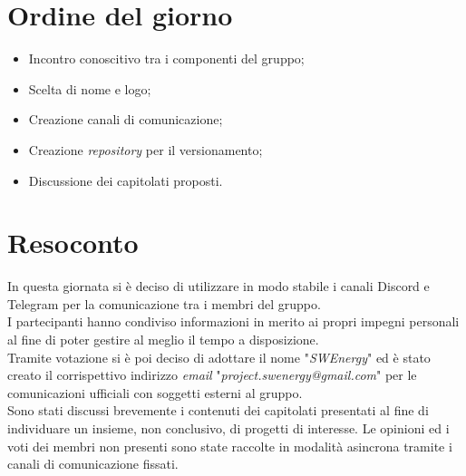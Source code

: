 \section{Ordine del giorno}
\begin{itemize}
    \item Incontro conoscitivo tra i componenti del gruppo;
    \item Scelta di nome e logo;
    \item Creazione canali di comunicazione;
    \item Creazione \textit{repository} per il versionamento;
    \item Discussione dei capitolati proposti.
\end{itemize}

\section{Resoconto}
In questa giornata si è deciso di utilizzare in modo stabile i canali Discord e Telegram per la comunicazione tra i membri del gruppo.\\
I partecipanti hanno condiviso informazioni in merito ai propri impegni personali al fine di poter gestire al meglio il tempo a disposizione. \\
\noindent
Tramite votazione si è poi deciso di adottare il nome "\textit{SWEnergy}" ed è stato creato il corrispettivo indirizzo \textit{email} "\textit{project.swenergy@gmail.com}" per le comunicazioni ufficiali con soggetti esterni al gruppo. \\
\noindent
Sono stati discussi brevemente i contenuti dei capitolati presentati al fine di individuare un insieme, non conclusivo, di progetti di interesse.
Le opinioni ed i voti dei membri non presenti sono state raccolte in modalità asincrona tramite i canali di comunicazione fissati.
